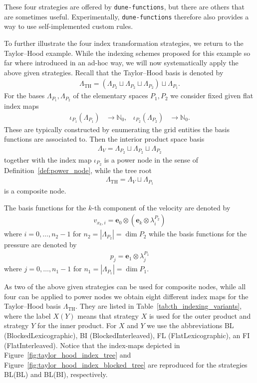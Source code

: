 \documentclass[a4paper,10pt,headings=normal,bibliography=totoc]{scrartcl}
\newcommand{\dunemodule}[1]{\texttt{#1}}
\begin{document}
These four strategies are offered by \dunemodule{dune-functions}, but there are others
that are sometimes useful.  Experimentally, \dunemodule{dune-functions} therefore also
provides a way to use self-implemented custom rules.

\bigskip

To further illustrate the four index transformation strategies, we return to
the Taylor--Hood example.
While the indexing schemes proposed for this example so far where
introduced in an ad-hoc way, we will now systematically apply
the above given strategies.  Recall that the Taylor--Hood basis is denoted by
\begin{align*}
 \Lambda_\text{TH}
  = (\Lambda_{P_2} \sqcup \Lambda_{P_2} \sqcup \Lambda_{P_2}) \sqcup \Lambda_{P_1}.
\end{align*}
For the bases $\Lambda_{P_1}, \Lambda_{P_2}$
of the elementary spaces $P_1,P_2$ we consider fixed given flat index maps
\begin{align*}
  \iota_{P_1}(\Lambda_{P_1}) &\to \mathbb{N}_0, &
  \iota_{P_2}(\Lambda_{P_2}) &\to \mathbb{N}_0.
\end{align*}
These are typically constructed by enumerating the grid entities
the basis functions are associated to.
Then the interior product space basis
\begin{align*}
  \Lambda_V = \Lambda_{P_2} \sqcup \Lambda_{P_2} \sqcup \Lambda_{P_2}
\end{align*}
together with the index map $\iota_{P_2}$ is a power node in the
sense of Definition~\ref{def:power_node}, while the tree root
\begin{align*}
 \Lambda_\text{TH}
  = \Lambda_V \sqcup \Lambda_{P_1}
\end{align*}
is a composite node.

The basis functions for the $k$-th component of the velocity
are denoted by
\begin{align*}
  v_{x_k,i} = \mathbf{e}_0 \otimes (\mathbf{e}_k \otimes \lambda^{P_2}_i)
\end{align*}
where $i=0,\dots,n_2-1$ for $n_2=|\Lambda_{P_2}|= \operatorname{dim} P_2$
while the basis functions for the pressure are denoted by
\begin{align*}
  p_{j} = \mathbf{e}_1 \otimes \lambda^{P_1}_j
\end{align*}
where $j=0,\dots,n_1-1$ for $n_1=|\Lambda_{P_1}|= \operatorname{dim} P_1$.

As two of the above given strategies can be used
for composite nodes, while all four can be applied to power nodes
we obtain eight different index maps for the Taylor--Hood basis
$\Lambda_{\text{TH}}$.
They are listed in Table~\ref{tab:th_indexing_variants}, where the label $X(Y)$
means that strategy $X$ is used for the outer product and strategy $Y$
for the inner product. For $X$ and $Y$ we use the abbreviations BL
(BlockedLexicographic), BI (BlockedInterleaved), FL (FlatLexicographic), an FI (FlatInterleaved).
Notice that the index-maps depicted in
Figure~\ref{fig:taylor_hood_index_tree} and Figure~\ref{fig:taylor_hood_index_blocked_tree}
are reproduced for the strategies
BL(BL) and BL(BI), respectively.
\end{document}
